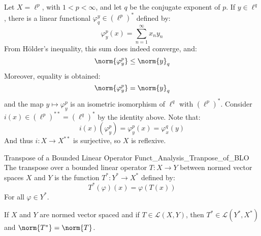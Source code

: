         \begin{lexample}
            Let $X=\ell^{p}$, with $1<p<\infty$, and let
            $q$ be the conjugate exponent of $p$. If $y\in\ell^{q}$,
            there is a linear functional
            $\varphi_{q}^{y}\in(\ell^{p})^{*}$ defined by:
            \begin{equation}
                \varphi_{y}^{p}(x)=\sum_{n=1}^{\infty}x_{n}y_{n}
            \end{equation}
            From H\"{o}lder's inequality, this sum does indeed
            converge, and:
            \begin{equation}
                \norm{\varphi_{y}^{p}}\leq\norm{y}_{q}
            \end{equation}
            Moreover, equality is obtained:
            \begin{equation}
                \norm{\varphi_{y}^{p}}=\norm{y}_{q}
            \end{equation}
            and the map $y\mapsto\varphi_{y}^{p}$ is an
            isometric isomorphism of $\ell^{q}$ with
            $(\ell^{p})^{*}$. Consider
            $i(x)\in(\ell^{p})^{**}=(\ell^{q})^{*}$ by
            the identity above. Note that:
            \begin{equation}
                i(x)(\varphi_{y}^{p})=\varphi_{y}^{p}(x)
                =\varphi_{x}^{q}(y)
            \end{equation}
            And thus $i:X\rightarrow{X}^{**}$ is surjective, so
            $X$ is reflexive.
        \end{lexample}
        \begin{ldefinition}{Transpose of a Bounded Linear Operator}
              {Funct_Analysis_Tranpose_of_BLO}
            The transpose over a bounded linear operator
            $T:X\rightarrow{Y}$ between normed vector spaces $X$
            and $Y$ is the function $T^{*}:Y^{*}\rightarrow{X}^{*}$
            defined by:
            \begin{equation}
                T^{*}(\varphi)(x)=\varphi(T(x))
            \end{equation}
            For all $\varphi\in{Y}^{*}$.
        \end{ldefinition}
        \begin{theorem}
            If $X$ and $Y$ are normed vector spaced and if
            $T\in\mathcal{L}(X,Y)$, then
            $T^{*}\in\mathcal{L}(Y^{*},X^{*})$ and
            $\norm{T^{*}}=\norm{T}$.
        \end{theorem}
